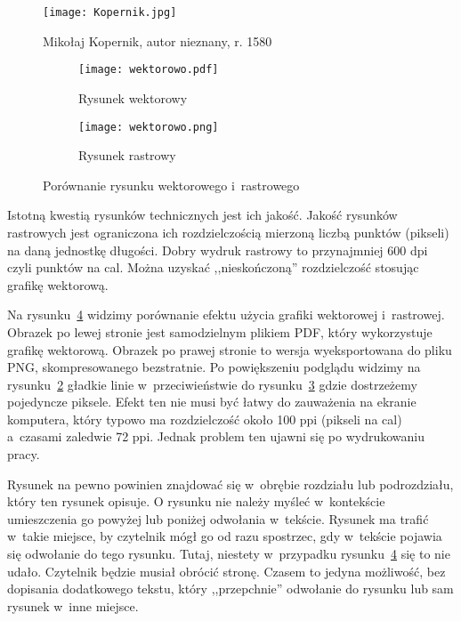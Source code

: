 \begin{figure}[h]
	\centering \texttt{[image: Kopernik.jpg]} %
	\caption{Mikołaj Kopernik, autor nieznany, r. 1580}
	\label{rys:kopernik}
\end{figure}

\begin{figure}
\centering
\begin{subfigure}{.5\textwidth}
  \centering
  \texttt{[image: wektorowo.pdf]} %
  \caption{Rysunek wektorowy}
  \label{rys:wektorowopdf}
\end{subfigure}%
\begin{subfigure}{.5\textwidth}
  \centering
  \texttt{[image: wektorowo.png]}
  \caption{Rysunek rastrowy}
  \label{rys:wektorowopng}
\end{subfigure}
\caption{Porównanie rysunku wektorowego i~rastrowego}
\label{rys:wektorowo}
\end{figure}

Istotną kwestią rysunków technicznych jest ich jakość. Jakość rysunków rastrowych jest ograniczona ich rozdzielczością mierzoną liczbą punktów (pikseli) na daną jednostkę długości. Dobry wydruk rastrowy to przynajmniej 600 dpi czyli punktów na cal. Można uzyskać ,,nieskończoną'' rozdzielczość stosując grafikę wektorową.

Na rysunku~\ref{rys:wektorowo} widzimy porównanie efektu użycia grafiki wektorowej i~rastrowej. Obrazek po lewej stronie jest samodzielnym plikiem PDF, który wykorzystuje grafikę wektorową. Obrazek po prawej stronie to wersja wyeksportowana do pliku PNG, skompresowanego bezstratnie. Po powiększeniu podglądu widzimy na rysunku~\ref{rys:wektorowopdf} gładkie linie w~przeciwieństwie do rysunku~\ref{rys:wektorowopng} gdzie dostrzeżemy pojedyncze piksele. Efekt ten nie musi być łatwy do zauważenia na ekranie komputera, który typowo ma rozdzielczość około 100 ppi (pikseli na cal) a~czasami zaledwie 72 ppi. Jednak problem ten ujawni się po wydrukowaniu pracy.

Rysunek na pewno powinien znajdować się w~obrębie rozdziału lub podrozdziału, który ten rysunek opisuje. O rysunku nie należy myśleć w~kontekście umieszczenia go powyżej lub poniżej odwołania w~tekście. Rysunek ma trafić w~takie miejsce, by czytelnik mógł go od razu spostrzec, gdy w~tekście pojawia się odwołanie do tego rysunku. Tutaj, niestety w~przypadku rysunku~\ref{rys:wektorowo} się to nie udało. Czytelnik będzie musiał obrócić stronę. Czasem to jedyna możliwość, bez dopisania dodatkowego tekstu, który ,,przepchnie'' odwołanie do rysunku lub sam rysunek w~inne miejsce.

